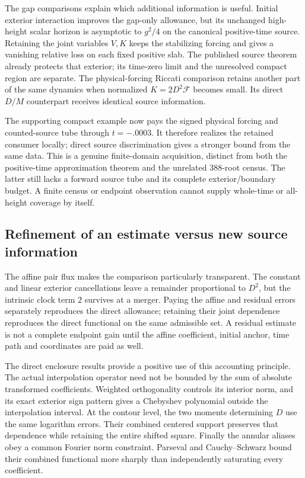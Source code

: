The gap comparisons explain which additional information is useful.
Initial exterior interaction improves the gap-only allowance, but its
unchanged high-height scalar horizon is asymptotic to $g^2/4$ on the
canonical positive-time source. Retaining the joint variables $V,K$
keeps the stabilizing forcing and gives a vanishing relative loss on each
fixed positive slab. The published source theorem already protects that
exterior; its time-zero limit and the unresolved compact region are
separate. The physical-forcing Riccati comparison retains another part of
the same dynamics when normalized $K=2D^2\mathcal F$ becomes small.
Its direct $D/M$ counterpart receives identical source information.

The supporting compact example now pays the signed physical forcing and
counted-source tube through $t=-.0003$. It therefore realizes the retained
consumer locally; direct source discrimination gives a stronger bound
from the same data. This is a genuine finite-domain acquisition, distinct
from both the positive-time approximation theorem and the unrelated
388-root census. The latter still lacks a forward source tube and its
complete exterior/boundary budget. A finite census or endpoint observation
cannot supply whole-time or all-height coverage by itself.

\subsection{Refinement of an estimate versus new source information}

The affine pair flux makes the comparison particularly transparent. The
constant and linear exterior cancellations leave a remainder proportional
to $D^2$, but the intrinsic clock term $2$ survives at a merger. Paying
the affine and residual errors separately reproduces the direct allowance;
retaining their joint dependence reproduces the direct functional on the
same admissible set. A residual estimate is not a complete endpoint gain
until the affine coefficient, initial anchor, time path and coordinates
are paid as well.

The direct enclosure results provide a positive use of this accounting
principle. The actual interpolation operator need not be bounded by the
sum of absolute transformed coefficients. Weighted orthogonality controls
its interior norm, and its exact exterior sign pattern gives a Chebyshev
polynomial outside the interpolation interval. At the contour level, the
two moments determining $D$ use the same logarithm errors. Their combined
centered support preserves that dependence while retaining the entire
shifted square. Finally the annular aliases obey a common Fourier norm
constraint. Parseval and Cauchy--Schwarz bound their combined functional
more sharply than independently saturating every coefficient.


